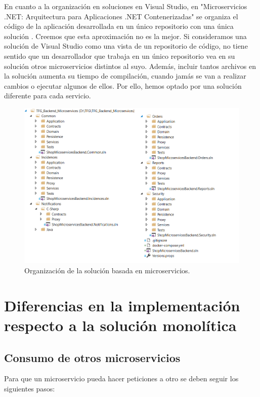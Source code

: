 \documentclass[11pt,spanish,listoffigures]{tfgetsinf}
\begin{document}
En cuanto a la organización en soluciones en Visual Studio, en "Microservicios .NET: Arquitectura para Aplicaciones .NET Contenerizadas" se organiza el código de la aplicación desarrollada en un único repositorio con una única solución \cite{DelaTorre2018}. Creemos que esta aproximación no es la mejor. Si consideramos una solución de Visual Studio como una vista de un repositorio de código, no tiene sentido que un desarrollador que trabaja en un único repositorio vea en su solución otros microservicios distintos al suyo. Además, incluir tantos archivos en la solución aumenta su tiempo de compilación, cuando jamás se van a realizar cambios o ejecutar algunos de ellos. Por ello, hemos optado por una solución diferente para cada servicio.

\begin{figure}[h]
\centering
\includegraphics[scale=0.85]{MicroservicesSolution}
\caption{Organización de la solución basada en microservicios.}
\end{figure}

\section{Diferencias en la implementación respecto a la solución monolítica}

\subsection{Consumo de otros microservicios} \label{subsect:Consumo}

Para que un microservicio pueda hacer peticiones a otro se deben seguir los siguientes pasos:
\end{document}

